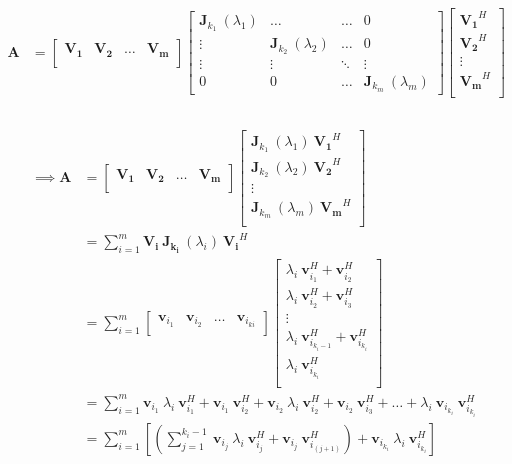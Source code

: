 \begin{align*}
\bm{A}&=
\begin{bmatrix}
\bm{V_1} & \bm{V_2} & \dots & \bm{V_m} \\ 
\end{bmatrix}
\begin{bmatrix}
\bm{J}_{k_1}\:(\lambda_1) & \dots & \dots & 0 \\
\vdots & \bm{J}_{k_2}\:(\lambda_2) & \dots & 0 \\
\vdots & \vdots & \ddots & \vdots \\
0 & 0 & \dots & \bm{J}_{k_m}\:(\lambda_m) 
\end{bmatrix}
\begin{bmatrix}
\bm{V_1}^H \\
\bm{V_2}^H \\
\vdots \\
\bm{V_m}^H \\
\end{bmatrix} \\
\end{align*}
\\
\begin{align*}
\implies \bm{A}&=
\begin{bmatrix}
\bm{V_1} & \bm{V_2} & \dots & \bm{V_m} \\ 
\end{bmatrix}
\begin{bmatrix}
\bm{J}_{k_1}\:(\lambda_1)\:\bm{V_1}^H \\
\bm{J}_{k_2}\:(\lambda_2)\:\bm{V_2}^H \\
\vdots \\
\bm{J}_{k_m}\:(\lambda_m)\:\bm{V_m}^H \\
\end{bmatrix}
\\
&= \sum_{i=1}^m \bm{V_i}\: \bm{J_{k_i}}\: (\lambda_i)\: \bm{V_i}^H \\
	&= \sum_{i=1}^m
	\begin{bmatrix}
	\bm{v}_{i_1} & \bm{v}_{i_2} & \dots & \bm{v}_{i_{ki}} \\ 
	\end{bmatrix}
	\begin{bmatrix}
	\lambda_i\:\bm{v}_{i_1}^H + \bm{v}_{i_2}^H \\
	\lambda_i\:\bm{v}_{i_2}^H  + \bm{v}_{i_3}^H  \\
	\vdots \\
	\lambda_i\:\bm{v}_{i_{k_i - 1}}^H  + \bm{v}_{i_{k_i}}^H \\
	\lambda_i\:\bm{v}_{i_{k_i}}^H \\
	\end{bmatrix} \\
	&= \sum_{i=1}^m \bm{v}_{i_1}\:\lambda_i\:\bm{v}_{i_1}^H  + \bm{v}_{i_1}\:\bm{v}_{i_2}^H + \bm{v}_{i_2}\:\lambda_i\:\bm{v}_{i_2}^H  + \bm{v}_{i_2}\:\bm{v}_{i_3}^H + \dots + \lambda_i\:\bm{v}_{i_{k_i}}\:\bm{v}_{i_{k_i}}^H \\
	&= \sum_{i=1}^m \left[\left(\sum_{j=1}^{k_i - 1}\: \bm{v}_{i_j}\:\lambda_i\:\bm{v}_{i_j}^H +  \bm{v}_{i_j}\:\bm{v}_{i_{(j+1)}}^H\right) +  \bm{v}_{i_{k_i}}\:\lambda_i\:\bm{v}_{i_{k_i}}^H \right]
\end{align*}
